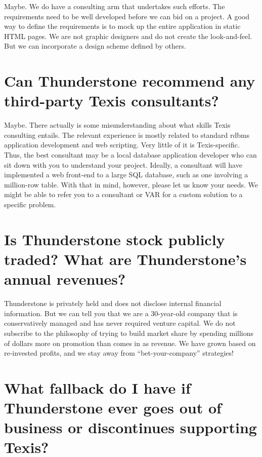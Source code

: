 Maybe.  We do have a consulting arm that undertakes such efforts.  The
requirements need to be well developed before we can bid on a project.
A good way to define the requirements is to mock up the entire
application in static HTML pages.  We are not graphic designers and do
not create the look-and-feel. But we can incorporate a design scheme
defined by others.

\section{Can Thunderstone recommend any third-party Texis consultants? }

Maybe.  There actually is some misunderstanding about what skills
Texis consulting entails.  The relevant experience is mostly related
to standard rdbms application development and web scripting.  Very
little of it is Texis-specific.  Thus, the best consultant may be a
local database application developer who can sit down with you to
understand your project.  Ideally, a consultant will have implemented
a web front-end to a large SQL database, such as one involving a
million-row table.  With that in mind, however, please let us know
your needs.  We might be able to refer you to a consultant or VAR for
a custom solution to a specific problem.

\section{Is Thunderstone stock publicly traded? What are Thunderstone's annual revenues? }

Thunderstone is privately held and does not disclose internal
financial information. But we can tell you that we are a 30-year-old
company that is conservatively managed and has never required venture
capital. We do not subscribe to the philosophy of trying to build
market share by spending millions of dollars more on promotion than
comes in as revenue. We have grown based on re-invested profits, and
we stay away from ``bet-your-company'' strategies!

\section{What fallback do I have if Thunderstone ever goes out of business or discontinues supporting Texis?}

